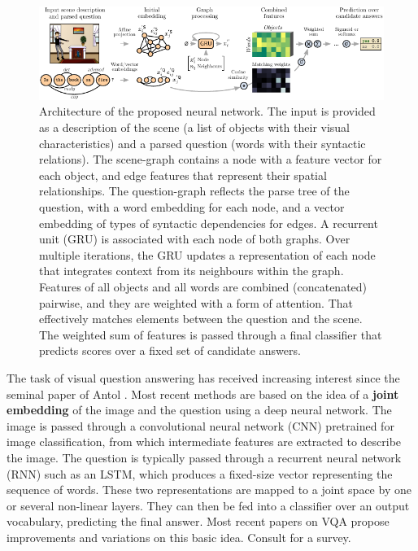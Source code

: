 \begin{figure}[t]
  \vspace{-3pt}
  \includegraphics[width=.95\linewidth]{fig-network.pdf}
  \vspace{-1pt}
  \caption{Architecture of the proposed neural network. The input is provided as a description of the scene (a list of objects with their visual characteristics) and a parsed question (words with their syntactic relations). The scene-graph contains a node with a feature vector for each object, and edge features that represent their spatial relationships. The question-graph reflects the parse tree of the question, with a word embedding for each node, and a vector embedding of types of syntactic dependencies for edges. A recurrent unit (GRU) is associated with each node of both graphs. Over multiple iterations, the GRU updates a representation of each node that integrates context from its neighbours within the graph. Features of all objects and all words are combined (concatenated) pairwise, and they are weighted with a form of attention. That effectively matches elements between the question and the scene. The weighted sum of features is passed through a final classifier that predicts scores over a fixed set of candidate answers.}
  \label{fig:network}
  \vspace{-10pt}
\end{figure}

The task of {visual question answering} has received increasing interest since the seminal paper of Antol \etal \cite{antol2015vqa}. Most recent methods are based on the idea of a \textbf{joint embedding} of the image and the question using a deep neural network. The image is passed through a convolutional neural network (CNN) pretrained for image classification, from which intermediate features are extracted to describe the image. The question is typically passed through a recurrent neural network (RNN) such as an LSTM, which produces a fixed-size vector representing the sequence of words. These two representations are mapped to a joint space by one or several non-linear layers. They can then be fed into a classifier over an output vocabulary, predicting the final answer. Most recent papers on VQA propose improvements and variations on this basic idea. Consult \cite{wu2016survey} for a survey.

